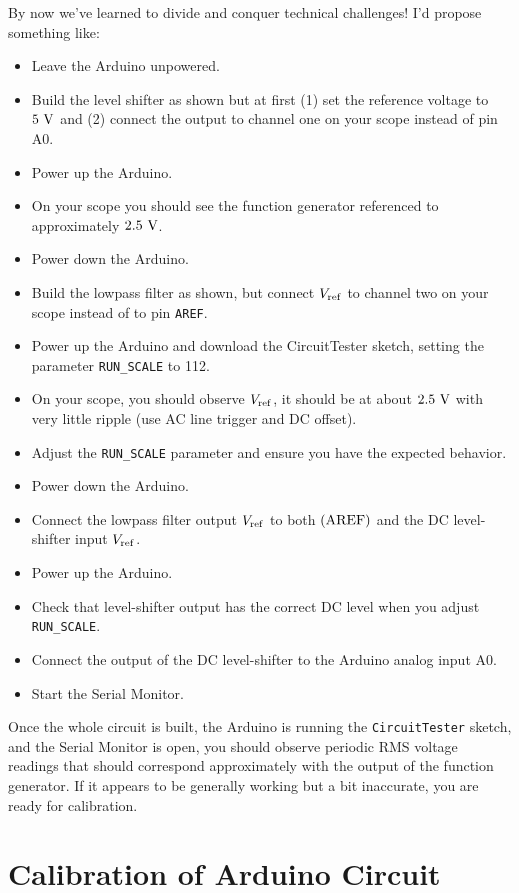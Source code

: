 \documentclass[12pt]{article}
\begin{document}
By now we've learned to divide and conquer technical challenges!  I'd propose something like:
\begin{itemize}
\item Leave the Arduino unpowered.
\item Build the level shifter as shown but at first (1) set the reference voltage to $5~\rm V$ and (2) connect the output to channel one on your scope instead of pin A0.
\item Power up the Arduino.
\item On your scope you should see the function generator referenced to approximately $2.5~\rm V$.
\item Power down the Arduino.
\item Build the lowpass filter as shown, but  connect $V_{\rm ref}$ to channel two on your scope instead of to pin {\tt AREF}.
\item Power up the Arduino and download the {\rm CircuitTester} sketch, setting the parameter {\tt RUN\_SCALE} to 112.
\item On your scope, you should observe $V_{\rm ref}$, it should be at about $2.5~\rm V$ with very little ripple (use AC line trigger and DC offset).
\item Adjust the {\tt RUN\_SCALE} parameter and ensure you have the expected behavior.
\item Power down the Arduino.
\item Connect the lowpass filter output $V_{\rm ref}$ to both $({\rm AREF})$ and the DC level-shifter input $V_{\rm ref}$.
\item Power up the Arduino.
\item Check that level-shifter output has the correct DC level when you adjust {\tt RUN\_SCALE}.
\item Connect the output of the DC level-shifter to the Arduino analog input A0.
\item Start the Serial Monitor.
\end{itemize}

Once the whole circuit is built, the Arduino is running the {\tt CircuitTester} sketch, and the Serial Monitor is open, you should observe periodic RMS voltage readings that should correspond approximately with the output of the function generator.  If it appears to be generally working but a bit inaccurate, you are ready for calibration.

\section{Calibration of Arduino Circuit}
\end{document}
